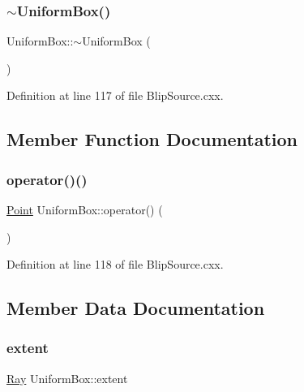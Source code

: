 \subsubsection{\texorpdfstring{$\sim$\+Uniform\+Box()}{~UniformBox()}}
{\footnotesize\ttfamily Uniform\+Box\+::$\sim$\+Uniform\+Box (\begin{DoxyParamCaption}{ }\end{DoxyParamCaption})\hspace{0.3cm}{\ttfamily [inline]}}



Definition at line 117 of file Blip\+Source.\+cxx.



\subsection{Member Function Documentation}
\mbox{\label{struct_uniform_box_ae795d3a060cfa527f56b794d93e50084}} 
\subsubsection{\texorpdfstring{operator()()}{operator()()}}
{\footnotesize\ttfamily \hyperlink{namespace_wire_cell_ab2b2565fa6432efbb4513c14c988cda9}{Point} Uniform\+Box\+::operator() (\begin{DoxyParamCaption}{ }\end{DoxyParamCaption})\hspace{0.3cm}{\ttfamily [inline]}}



Definition at line 118 of file Blip\+Source.\+cxx.



\subsection{Member Data Documentation}
\mbox{\label{struct_uniform_box_a9fb28af5ad857b4b381059fc77ab79c9}} 
\subsubsection{\texorpdfstring{extent}{extent}}
{\footnotesize\ttfamily \hyperlink{namespace_wire_cell_a3ab20d9b438feb7eb1ffaab9ba98af0c}{Ray} Uniform\+Box\+::extent}



